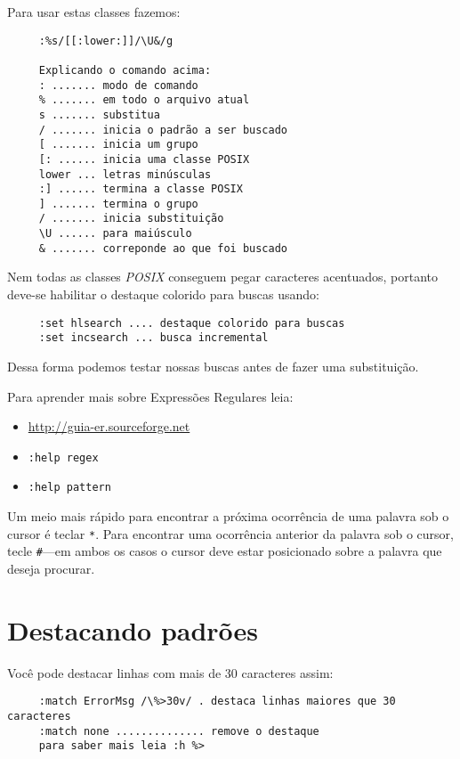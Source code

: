 Para usar estas classes fazemos:

\begin{verbatim}
     :%s/[[:lower:]]/\U&/g

     Explicando o comando acima:
     : ....... modo de comando
     % ....... em todo o arquivo atual
     s ....... substitua
     / ....... inicia o padrão a ser buscado
     [ ....... inicia um grupo
     [: ...... inicia uma classe POSIX
     lower ... letras minúsculas
     :] ...... termina a classe POSIX
     ] ....... termina o grupo
     / ....... inicia substituição
     \U ...... para maiúsculo
     & ....... correponde ao que foi buscado
\end{verbatim}

Nem todas as classes {\em POSIX} conseguem pegar caracteres
acentuados, portanto deve-se habilitar o destaque colorido para
buscas usando:

\begin{verbatim}
     :set hlsearch .... destaque colorido para buscas
     :set incsearch ... busca incremental
\end{verbatim}

Dessa forma podemos testar nossas buscas antes de fazer
uma substituição.


Para aprender mais sobre Expressões Regulares leia:

\begin{itemize}
  \item \url{http://guia-er.sourceforge.net}
  \item {\tt :help regex}
  \item {\tt :help pattern}
\end{itemize}

    Um meio mais rápido para encontrar a próxima ocorrência de uma palavra sob o
cursor é teclar \verb|*|. Para encontrar uma ocorrência anterior da palavra
sob o cursor, tecle \verb|#|---em ambos os casos o cursor deve estar
posicionado sobre a palavra que deseja procurar.

\section{Destacando padrões}
\label{sec:Destacando padrões}

Você pode destacar linhas com mais de 30 caracteres assim:

\begin{verbatim}
     :match ErrorMsg /\%>30v/ . destaca linhas maiores que 30 caracteres
     :match none .............. remove o destaque
     para saber mais leia :h %>
\end{verbatim}

